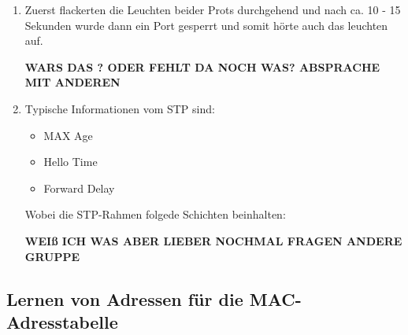 \documentclass{scrartcl}
\begin{document}
\begin{enumerate}
    \item
    Zuerst flackerten die Leuchten beider Prots durchgehend und nach ca. 10 - 15 Sekunden wurde dann ein Port gesperrt und somit hörte auch das leuchten auf.
    
    \textbf{WARS DAS ? ODER FEHLT DA NOCH WAS? ABSPRACHE MIT ANDEREN}
   
    \item
    Typische Informationen vom STP sind:
    
    \begin{itemize}
      \item MAX Age
      \item Hello Time
      \item Forward Delay
    \end{itemize}
     Wobei die STP-Rahmen folgede Schichten beinhalten: 
     
 	 \textbf{WEIß ICH WAS ABER LIEBER NOCHMAL FRAGEN ANDERE GRUPPE }
  \end{enumerate}
  

   \subsection[Aufgabe 6 Lernen von Adressen für die MAC-Adresstabelle]{Lernen von Adressen für die MAC-Adresstabelle}
   
\end{document}
